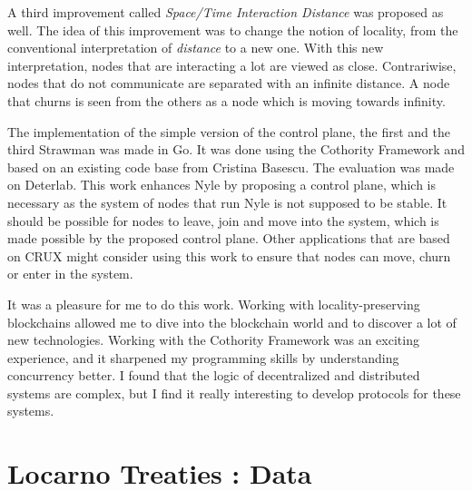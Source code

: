 \documentclass[a4paper,11pt,twoside=semi,openright]{report}
\begin{document}
A third improvement called \textit{Space/Time Interaction Distance} was
proposed as well. The idea of this improvement was to change the notion of
locality, from the conventional interpretation of \textit{distance} to a new one.
With this new interpretation, nodes that are interacting a lot are viewed as
close. Contrariwise, nodes that do not communicate are separated with an
infinite distance. A node that churns is seen from
the others as a node which is moving towards infinity.  

The implementation of the simple version of the control plane, the first and
the third Strawman was made in Go. It was done using the Cothority Framework
and based on an existing code base from Cristina Basescu. The evaluation was
made on Deterlab. This work enhances Nyle by proposing a control plane, which
is necessary as the system of nodes that run Nyle is not supposed to be
stable. It should be possible for nodes to leave, join and move into the
system, which is made possible by the proposed control plane. Other
applications that are based on CRUX \cite{Basescu2014} might consider using
this work to ensure that nodes can move, churn or enter in the system.

It was a pleasure for me to do this work. Working with locality-preserving
blockchains allowed me to dive into the blockchain world and to discover a lot
of new technologies. Working with the Cothority Framework was an exciting
experience, and it sharpened my programming skills by understanding concurrency better. I found that the logic of decentralized and distributed systems
are complex, but I find it really interesting to develop protocols for these
systems. 


\cleardoublepage {} {}

\printbibliography

\let\savecleardoublepage\cleardoublepage
\let\cleardoublepage\clearpage 
\appendix %

\chapter{Locarno Treaties : Data} \label{app:LocarnoTreaties-data}
\end{document}
